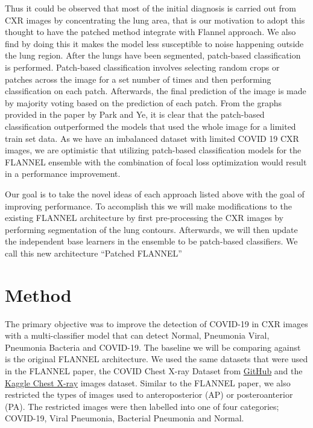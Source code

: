 \documentclass{sigkddExp}
\begin{document}
Thus it could be observed that most of the initial diagnosis is carried out from
CXR images by concentrating the lung area, that is our motivation to adopt this
thought to have the patched method integrate with Flannel approach. We also find
by doing this it makes the model less susceptible to noise happening outside the
lung region. After the lungs have been segmented, patch-based classification is
performed. Patch-based classification involves selecting random crops or patches
across the image for a set number of times and then performing classification on
each patch. Afterwards, the final prediction of the image is made by majority
voting based on the prediction of each patch. From the graphs provided in the
paper \cite{pmid32396075} by Park and Ye, it is clear that the patch-based
classification outperformed the models that used the whole image for a limited
train set data. As we have an imbalanced dataset with limited COVID 19 CXR
images, we are optimistic that utilizing patch-based classification models for
the FLANNEL ensemble with the combination of focal loss optimization would
result in a performance improvement.

Our goal is to take the novel ideas of each approach listed above with the goal
of improving performance. To accomplish this we will make modifications to the
existing FLANNEL architecture by first pre-processing the CXR images by
performing segmentation of the lung contours. Afterwards, we will then update
the independent base learners in the ensemble to be patch-based classifiers. We
call this new architecture “Patched FLANNEL”



\section{Method}

The primary objective was to improve the detection of COVID-19 in CXR images
with a multi-classifier model that can detect Normal, Pneumonia Viral, Pneumonia
Bacteria and COVID-19. The baseline we will be comparing against is the original
FLANNEL architecture. We used the same datasets that were used in the FLANNEL
paper, the COVID Chest X-ray Dataset from
\href{https://github.com/ieee8023/covid-chestxray-dataset}{GitHub} and the
\href{https://www.kaggle.com/paultimothymooney/chest-xray-pneumonia}{Kaggle
    Chest X-ray} images dataset. Similar to the FLANNEL paper, we also restricted
the types of images used to anteroposterior (AP) or posteroanterior (PA). The
restricted images were then labelled into one of four categories; COVID-19,
Viral Pneumonia, Bacterial Pneumonia and Normal.
\end{document}
